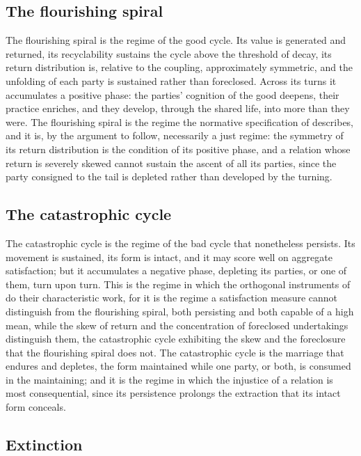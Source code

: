 \subsection{The flourishing spiral}
\label{p11:sec:reg-flourishing}

The flourishing spiral is the regime of the good cycle. Its value is generated and returned, its recyclability sustains the cycle above the threshold of decay, its return distribution is, relative to the coupling, approximately symmetric, and the unfolding of each party is sustained rather than foreclosed. Across its turns it accumulates a positive phase: the parties' cognition of the good deepens, their practice enriches, and they develop, through the shared life, into more than they were. The flourishing spiral is the regime the normative specification of  describes, and it is, by the argument to follow, necessarily a just regime: the symmetry of its return distribution is the condition of its positive phase, and a relation whose return is severely skewed cannot sustain the ascent of all its parties, since the party consigned to the tail is depleted rather than developed by the turning.

\subsection{The catastrophic cycle}
\label{p11:sec:reg-catastrophic}

The catastrophic cycle is the regime of the bad cycle that nonetheless persists. Its movement is sustained, its form is intact, and it may score well on aggregate satisfaction; but it accumulates a negative phase, depleting its parties, or one of them, turn upon turn. This is the regime in which the orthogonal instruments of  do their characteristic work, for it is the regime a satisfaction measure cannot distinguish from the flourishing spiral, both persisting and both capable of a high mean, while the skew of return and the concentration of foreclosed undertakings distinguish them, the catastrophic cycle exhibiting the skew and the foreclosure that the flourishing spiral does not. The catastrophic cycle is the marriage that endures and depletes, the form maintained while one party, or both, is consumed in the maintaining; and it is the regime in which the injustice of a relation is most consequential, since its persistence prolongs the extraction that its intact form conceals.

\subsection{Extinction}
\label{p11:sec:reg-extinction}

